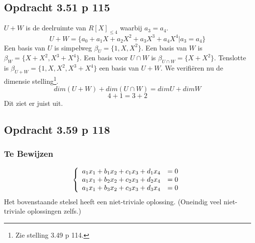 \documentclass[lineaire_algebra_oplossingen.tex]{subfiles}
\begin{document}








\subsection{Opdracht 3.51 p 115}
\label{3.51}
$U+W$ is de deelruimte van $R[X]_{\le4}$ waarbij $a_3 = a_4$.
\[U+W = \{a_0 + a_1 X + a_2 X^2 +a_3 X^3 + a_4 X^4 | a_3 = a_4\}\]
Een basis van $U$ is simpelweg $\beta_U = \{1,X,X^2\}$. Een basis van $W$ is $\beta_W = \{X+X^2,X^3+X^4\}$. Een basis voor $U\cap W$ is $\beta_{U\cap W} = \{X+X^2\}$. Tenslotte is $\beta_{U+W} = \{1,X,X^2,X^3+X^4\}$ een basis van $U+W$. We verifi\"eren nu de dimensie stelling\footnote{Zie stelling 3.49 p 114.}.
\[
dim(U+W) + dim(U\cap W) = dimU+dimW
\]
\[
4 + 1 = 3+2
\]
Dit ziet er juist uit.


%



\subsection{Opdracht 3.59 p 118}
\label{3.59}
\subsubsection*{Te Bewijzen}
\[
\left\lbrace
\begin{array}{c c}
a_1x_1 + b_1x_2 + c_1x_3 + d_1x_4 &= 0 \\
a_1x_1 + b_2x_2+ c_2x_3 + d_2x_4 &= 0 \\
a_1x_1 + b_3x_2+ c_3x_3 + d_3x_4 &= 0 \\
\end{array}
\right.
\]
Het bovenstaande stelsel heeft een niet-triviale oplossing. (Oneindig veel niet-triviale oplossingen zelfs.)
\end{document}
